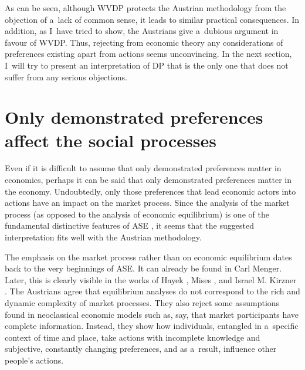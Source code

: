 As can be seen, although WVDP protects the Austrian methodology from the objection of a~lack of common sense, it leads to similar practical consequences. In addition, as I~have tried to show, the Austrians give a~dubious argument in favour of WVDP. Thus, rejecting from economic theory any considerations of preferences existing apart from actions seems unconvincing. In the next section, I~will try to present an interpretation of DP that is the only one that does not suffer from any serious objections.



\section{Only demonstrated preferences affect the social processes}

Even if it is difficult to assume that only demonstrated preferences matter in economics, perhaps it can be said that only demonstrated preferences matter in the economy. Undoubtedly, only those preferences that lead economic actors into actions have an impact on the market process. Since the analysis of the market process (as opposed to the analysis of economic equilibrium) is one of the fundamental distinctive features of ASE 
\parencites[][]{rothbard_present_2011}[][]{coyne_austrian_2015}, %
 it seems that the suggested interpretation fits well with the Austrian methodology.



The emphasis on the market process rather than on economic equilibrium dates back to the very beginnings of ASE. It can already be found in Carl Menger. Later, this is clearly visible in the works of Hayek 
\parencite*[][]{hayek_use_1945}, %
 Mises 
\parencite*[][]{mises_human_1998}, %
 and Israel M. Kirzner 
\parencite*[][]{kirzner_competition_1973}. %
 The Austrians agree that equilibrium analyses do not correspond to the rich and dynamic complexity of market processes. They also reject some assumptions found in neoclassical economic models such as, say, that market participants have complete information. Instead, they show how individuals, entangled in a~specific context of time and place, take actions with incomplete knowledge and subjective, constantly changing preferences, and as a~result, influence other people's actions.



